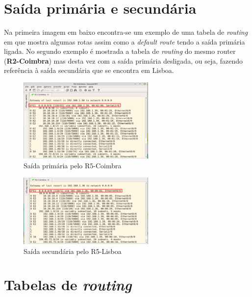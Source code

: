 \documentclass[11pt]{article}
\begin{document}
	\large	
	\section{Saída primária e secundária}
	\normalsize
	\paragraph{}
	Na primeira imagem em baixo encontra-se um exemplo de uma tabela de \emph{routing} em que mostra algumas rotas assim como a \emph{default route} tendo a saída primária ligada. No segundo exemplo é mostrada a tabela de \emph{routing} do mesmo router (\textbf{R2-Coimbra}) mas desta vez com a saída primária desligada, ou seja, fazendo referência à saída secundária que se encontra em Lisboa. 

	\begin{figure}[h]
		\centering
		\includegraphics[width=0.6\textwidth]{saida-primaria}
		\caption{Saída primária pelo R5-Coimbra}
		\label{fig.nav}
	\end{figure}


	\begin{figure}[h]
		\centering
		\includegraphics[width=0.6\textwidth]{saida-secundaria}
		\caption{Saída secundária pelo R5-Lisboa}
		\label{fig.nav}
	\end{figure}

	\pagebreak

	\large	
	\section{Tabelas de \emph{routing}}
	\normalsize
\end{document}
